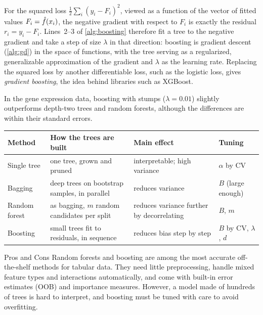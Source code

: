 \begin{remark}
For the squared loss $\frac12\sum_i(y_i-F_i)^2$, viewed as a function of the vector of fitted values $F_i=\hat f(x_i)$, the negative gradient with respect to $F_i$ is exactly the residual $r_i=y_i-F_i$. Lines~2--3 of \cref{alg:boosting} therefore fit a tree to the negative gradient and take a step of size $\lambda$ in that direction: boosting is gradient descent (\cref{alg:gd}) in the space of functions, with the tree serving as a regularized, generalizable approximation of the gradient and $\lambda$ as the learning rate. Replacing the squared loss by another differentiable loss, such as the logistic loss, gives \emph{gradient boosting}, the idea behind libraries such as XGBoost.
\end{remark}

In the gene expression data, boosting with stumps ($\lambda=0.01$) slightly outperforms depth-two trees and random forests, although the differences are within their standard errors.

\begin{center}
\small
\begin{tabularx}{\textwidth}{@{}l>{\raggedright\arraybackslash}X>{\raggedright\arraybackslash}X>{\raggedright\arraybackslash}X@{}}
\toprule
Method & How the trees are built & Main effect & Tuning \\
\midrule
Single tree & one tree, grown and pruned & interpretable; high variance & $\alpha$ by CV \\
Bagging & deep trees on bootstrap samples, in parallel & reduces variance & $B$ (large enough) \\
Random forest & as bagging, $m$ random candidates per split & reduces variance further by decorrelating & $B$, $m$ \\
Boosting & small trees fit to residuals, in sequence & reduces bias step by step & $B$ by CV, $\lambda$, $d$ \\
\bottomrule
\end{tabularx}
\end{center}

\begin{notebox}{Pros and Cons}
Random forests and boosting are among the most accurate off-the-shelf methods for tabular data. They need little preprocessing, handle mixed feature types and interactions automatically, and come with built-in error estimates (OOB) and importance measures. However, a model made of hundreds of trees is hard to interpret, and boosting must be tuned with care to avoid overfitting.
\end{notebox}

